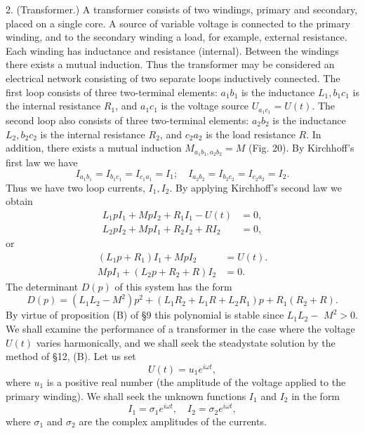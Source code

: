\documentclass[10pt,a5paper]{book}
\theoremstyle{plain}
\theoremstyle{definition}
\theoremstyle{remark}
\begin{document}
2. (Transformer.) A transformer consists of two windings, primary and secondary, placed on a single core. A source of variable voltage is connected to the primary winding, and to the secondary winding a load, for example, external resistance. Each winding has inductance and resistance (internal). Between the windings there exists a mutual induction. Thus the transformer may be considered an electrical network consisting of two separate loops inductively connected. The first loop consists of three two-terminal elements: $a_{1} b_{1}$ is the inductance $L_{1}, b_{1} c_{1}$ is the internal resistance $R_{1}$, and $a_{1} c_{1}$ is the voltage source $U_{a_{1} c_{1}}=U(t)$. The second loop also consists of three two-terminal elements: $a_{2} b_{2}$ is the inductance $L_{2}, b_{2} c_{2}$ is the internal resistance $R_{2}$, and $c_{2} a_{2}$ is the load resistance $R$. In addition, there exists a mutual induction $M_{a_{1} b_{1}, a_{2} b_{2}}=M$ (Fig. 20). By Kirchhoff's first law we have
\[
I_{a_{1} b_{1}}=I_{b_{1} c_{1}}=I_{c_{1} a_{1}}=I_{1} ; \quad I_{a_{2} b_{2}}=I_{b_{2} c_{2}}=I_{c_{2} a_{2}}=I_{2} .
\]
Thus we have two loop currents, $I_{1}, I_{2}$. By applying Kirchhoff's second law we obtain
\[
\begin{aligned}
L_{1} p I_{1}+M p I_{2}+R_{1} I_{1}-U(t) & =0, \\
L_{2} p I_{2}+M p I_{1}+R_{2} I_{2}+R I_{2} & =0,
\end{aligned}
\]
or
\[
\begin{aligned}
\left(L_{1} p+R_{1}\right) I_{1}+M p I_{2} & =U(t) . \\
M p I_{1}+\left(L_{2} p+R_{2}+R\right) I_{2} & =0 .
\end{aligned}
\]
The determinant $D(p)$ of this system has the form
\[
D(p)=\left(L_{1} L_{2}-M^{2}\right) p^{2}+\left(L_{1} R_{2}+L_{1} R+L_{2} R_{1}\right) p+R_{1}\left(R_{2}+R\right) .
\]
By virtue of proposition (B) of §9 this polynomial is stable since $L_{1} L_{2}-$ $M^{2}>0$. We shall examine the performance of a transformer in the case where the voltage $U(t)$ varies harmonically, and we shall seek the steadystate solution by the method of §12, (B). Let us set
\[
U(t)=u_{1} e^{i \omega t},
\]
where $u_{1}$ is a positive real number (the amplitude of the voltage applied to the primary winding). We shall seek the unknown functions $I_{1}$ and $I_{2}$ in the form
\[
I_{1}=\sigma_{1} e^{i \omega t}, \quad I_{2}=\sigma_{2} e^{i \omega t},
\]
where $\sigma_{1}$ and $\sigma_{2}$ are the complex amplitudes of the currents.
\end{document}
